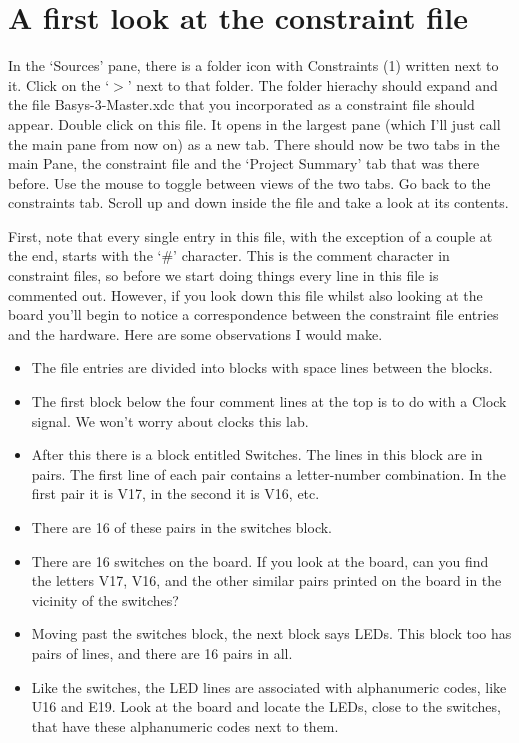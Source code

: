 \documentclass[../physical_computing.tex]{subfiles}
\begin{document}
\section{A first look at the constraint file}
\label{sec:constraint_file}

In the `Sources' pane, there is a folder icon with Constraints (1) written next to it. Click on the `$>$' next to that folder. The folder hierachy should expand and the file Basys-3-Master.xdc that you incorporated as a constraint file should appear. Double click on this file. It opens in the largest pane (which I'll just call the main pane from now on) as a new tab. There should now be two tabs in the main Pane, the constraint file and the `Project Summary' tab that was there before. Use the mouse to toggle between views of the two tabs. Go back to the constraints tab. Scroll up and down inside the file and take a look at its contents.

First, note that every single entry in this file, with the exception of a couple at the end, starts with the `\#' character. This is the comment character in constraint files, so before we start doing things every line in this file is commented out. However, if you look down this file whilst also looking at the board you'll begin to notice a correspondence between the constraint file entries and the hardware. Here are some observations I would make.

\begin{itemize}
    \item The file entries are divided into blocks with space lines between the blocks.
    \item The first block below the four comment lines at the top is to do with a Clock signal. We won't worry about clocks this lab.
    \item After this there is a block entitled Switches. The lines in this block are in pairs. The first line of each pair contains a letter-number combination. In the first pair it is V17, in the second it is V16, etc.
    \item There are 16 of these pairs in the switches block.
    \item There are 16 switches on the board. If you look at the board, can you find the letters V17, V16, and the other similar pairs printed on the board in the vicinity of the switches?
    \item Moving past the switches block, the next block says LEDs. This block too has pairs of lines, and there are 16 pairs in all.
    \item Like the switches, the LED lines are associated with alphanumeric codes, like U16 and E19. Look at the board and locate the LEDs, close to the switches, that have these alphanumeric codes next to them.
\end{itemize}
\end{document}
